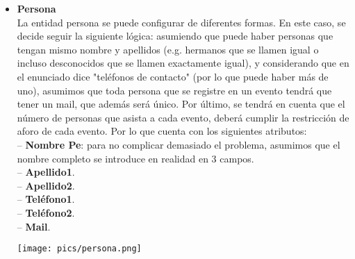 \documentclass[12pt]{article}
\begin{document}
\begin{itemize}
        \item \textbf{Persona}\\
            La entidad persona se puede configurar de diferentes formas. En este caso, se decide seguir la siguiente lógica:
            asumiendo que puede haber personas que tengan mismo nombre y apellidos (e.g. hermanos que se llamen igual o incluso 
            desconocidos que se llamen exactamente igual), y considerando que en el enunciado dice "teléfonos de contacto" (por lo que puede haber más de uno),
            asumimos que toda persona que se registre en un evento tendrá que tener un mail, que además será único. 
            Por último, se tendrá en cuenta que el número de personas que asista a cada evento, deberá cumplir la restricción de aforo de cada evento.
            Por lo que cuenta con los siguientes atributos: \\
                \hspace{0.5cm} -- {\bfseries Nombre Pe}: para no complicar demasiado el problema, asumimos que el nombre completo se introduce en realidad en 3 campos. \\
                \hspace{0.5cm} -- {\bfseries Apellido1}. \\
                \hspace{0.5cm} -- {\bfseries Apellido2}. \\
                \hspace{0.5cm} -- {\bfseries Teléfono1}. \\
                \hspace{0.5cm} -- {\bfseries Teléfono2}. \\
                \hspace{0.5cm} -- {\bfseries Mail}.
            \begin{center}
            {\texttt{[image: pics/persona.png]}}
            \end{center}
        

\end{itemize}
\end{document}
